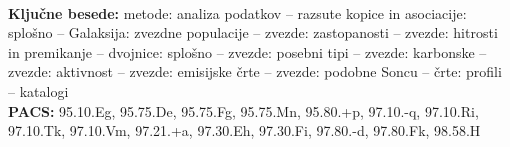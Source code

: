 %
%
%

\\[10mm]
{\bf Ključne besede:} metode: analiza podatkov -- razsute kopice in asociacije: splošno -- Galaksija: zvezdne populacije -- zvezde: zastopanosti -- zvezde: hitrosti in premikanje -- dvojnice: splošno -- zvezde: posebni tipi -- zvezde: karbonske -- zvezde: aktivnost -- zvezde: emisijske črte -- zvezde: podobne Soncu -- črte: profili -- katalogi\\[3mm]
{\bf PACS:} 95.10.Eg, 95.75.De, 95.75.Fg, 95.75.Mn, 95.80.+p, 97.10.-q, 97.10.Ri, 97.10.Tk, 97.10.Vm, 97.21.+a, 97.30.Eh, 97.30.Fi, 97.80.-d, 97.80.Fk, 98.58.H